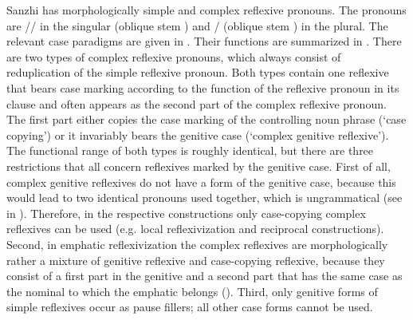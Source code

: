Sanzhi has morphologically simple and complex reflexive pronouns. The pronouns are \slash{}\slash{} in the singular (oblique stem ) and \slash{} (oblique stem ) in the plural. The relevant case paradigms are given in . Their functions are summarized in . There are two types of complex reflexive pronouns, which always consist of reduplication of the simple reflexive pronoun. Both types contain one reflexive that bears case marking according to the function of the reflexive pronoun in its clause and often appears as the second part of the complex reflexive pronoun. The first part either copies the case marking of the controlling noun phrase (`case copying') or it invariably bears the genitive case (`complex genitive reflexive'). The functional range of both types is roughly identical, but there are three restrictions that all concern reflexives marked by the genitive case. First of all, complex genitive reflexives do not have a form of the genitive case, because this would lead to two identical pronouns used together, which is ungrammatical (see  in ). Therefore, in the respective constructions only case-copying complex reflexives can be used (e.g. local reflexivization and reciprocal constructions). Second, in emphatic reflexivization the complex reflexives are morphologically rather a mixture of genitive reflexive and case-copying reflexive, because they consist of a first part in the genitive and a second part that has the same case as the nominal to which the emphatic belongs (). Third, only genitive forms of simple reflexives occur as pause fillers; all other case forms cannot be used.
%
